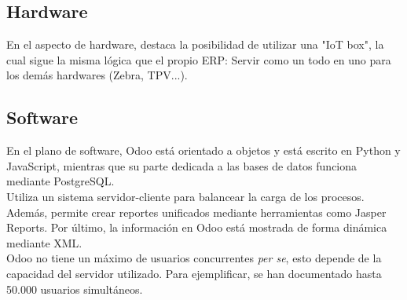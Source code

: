 \documentclass[openany,overnay,a4paper, twoside, 12pt]{book}
\begin{document}
\subsection{Hardware}
En el aspecto de hardware, destaca la posibilidad de utilizar una "IoT box", la cual sigue la misma lógica que el propio ERP: Servir como un todo en uno para los demás hardwares (Zebra, TPV...).\\
\subsection{Software}
En el plano de software, Odoo está orientado a objetos y está escrito en Python y JavaScript, mientras que su parte dedicada a las bases de datos funciona mediante PostgreSQL. \\
Utiliza un sistema servidor-cliente para balancear la carga de los procesos. Además, permite crear reportes unificados mediante herramientas como Jasper Reports. Por último, la información en Odoo está mostrada de forma dinámica mediante XML.\\
Odoo no tiene un máximo de usuarios concurrentes \textit{per se}, esto depende de la capacidad del servidor utilizado. Para ejemplificar, se han documentado hasta 50.000 usuarios simultáneos. \\\\
\end{document}
